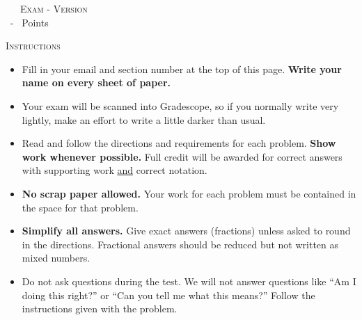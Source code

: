 \begin{center}
  \textsc{\GetTerm \ \GetCourse \ \GetExamUnit \ Exam - Version \GetVersionID {}}\\
  \footnotesize \GetExamLength \ - \pointssum* \ Points
\end{center}

\noindent \textsc{Instructions}
\begin{small}
\begin{itemize}
\item Fill in your email and section number at the top of this page. \textbf{Write your name on every sheet of paper.}
\item Your exam will be scanned into Gradescope, so if you normally write very lightly, make an effort to write a little darker than usual. %
\item Read and follow the directions and requirements for each problem. \textbf{Show work whenever possible.} Full credit will be awarded for correct answers with supporting work \underline{and} correct notation.
\item \textbf{No scrap paper allowed.} Your work for each problem must be contained in the space for that problem.
\item \textbf{Simplify all answers.} Give exact answers (fractions) unless asked to round in the directions. Fractional answers should be reduced but not written as mixed numbers.
\item Do not ask questions during the test. We will not answer questions like ``Am I doing this right?'' or ``Can you tell me what this means?'' Follow the instructions given with the problem.\\
\end{itemize}
\end{small}

